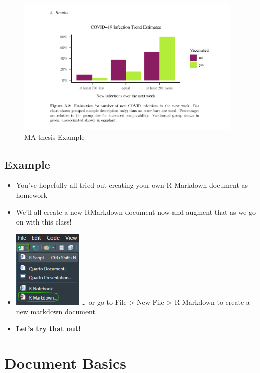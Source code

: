 \documentclass[
]{book}
\providecommand{\tightlist}{%
  \setlength{\itemsep}{0pt}\setlength{\parskip}{0pt}}
\begin{document}
\begin{figure}
\centering
\includegraphics[width=\textwidth,height=2.60417in]{./img/MArmdex.png}
\caption{MA thesis Example}
\end{figure}

\subsection{Example}\label{example-3}

\begin{itemize}
\tightlist
\item
  You've hopefully all tried out creating your own R Markdown document as homework
\item
  We'll all create a new RMarkdown document now and augment that as we go on with this class!
\item
  \includegraphics[width=\textwidth,height=1.45833in]{./img/rmd-click.png} \ldots{} or go to File \textgreater{} New File \textgreater{} R Markdown to create a new markdown document
\item
  \textbf{Let's try that out!}
\end{itemize}

\section{Document Basics}\label{document-basics}
\end{document}

